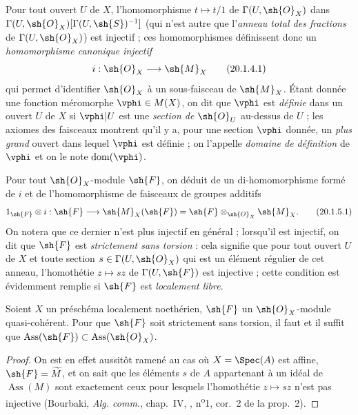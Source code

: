 \begin{env}[20.1.4]
\label{IV.20.1.4}
Pour tout ouvert $U$ de $X$, l'homomorphisme $t\mapsto t/1$ de $\Gamma(U,\sh{O}_X)$ dans $\Gamma(U,\sh{O}_X)[\Gamma(U,\sh{S})^{-1}]$ (qui n'est autre que l'\emph{anneau total des fractions} de
$\Gamma(U,\sh{O}_X)$) est injectif ; ces homomorphismes définissent donc un \emph{homomorphisme canonique injectif}
\[
\label{IV.20.1.4.1}
  i:\sh{O}_X\to\sh{M}_X
  \tag{20.1.4.1}
\]
qui permet d'identifier $\sh{O}_X$ à un sous-faisceau de $\sh{M}_X$.
Étant donnée une fonction méromorphe $\vphi\in M(X)$, on dit que $\vphi$ est \emph{définie} dans un ouvert $U$ de $X$ si $\vphi|U$ est une \emph{section de $\sh{O}_U$} au-dessus de $U$ ; les axiomes des faisceaux montrent qu'il y a, pour une section $\vphi$ donnée, un \emph{plus grand} ouvert dans lequel $\vphi$ est définie ; on l'appelle \emph{domaine de définition} de $\vphi$ et on le note $\operatorname{dom}(\vphi)$.
\end{env}

\begin{env}[20.1.5]
\label{IV.20.1.5}
Pour tout $\sh{O}_X$-module $\sh{F}$, on déduit de  un di-homomorphisme formé de $i$ et de l'homomorphisme de faisceaux de groupes additifs
\[
\label{IV.20.1.5.1}
  1_{\sh{F}}\otimes i:\sh{F}\to\sh{M}_X(\sh{F})=\sh{F}\otimes_{\sh{O}_X}\sh{M}_X.
  \tag{20.1.5.1}
\]
On notera que ce dernier n'est plus injectif en général ; lorsqu'il est injectif, on dit que $\sh{F}$ est \emph{strictement sans torsion} : cela signifie que pour tout ouvert $U$ de $X$ et toute section $s\in\Gamma(U,\sh{O}_X)$ qui est un élément régulier de cet anneau, l'homothétie $z\mapsto sz$ de $\Gamma(U,\sh{F})$ est injective ; cette condition est évidemment remplie si $\sh{F}$ est \emph{localement libre}.
\end{env}

\begin{proposition}[20.1.6]
\label{IV.20.1.6}
Soient $X$ un préschéma localement noethérien, $\sh{F}$ un $\sh{O}_X$-module quasi-cohérent.
Pour que $\sh{F}$ soit strictement sans torsion, il faut et il suffit que $\operatorname{Ass}(\sh{F})\subset\operatorname{Ass}(\sh{O}_X)$.
\end{proposition}

\begin{proof}
On est en effet aussitôt ramené au cas où $X=\Spec(A)$ est affine, $\sh{F}=\widetilde M$, et on sait que les éléments $s$ de $A$ appartenant à un idéal de $\operatorname{Ass}(M)$ sont exactement ceux pour lesquels l'homothétie $z\mapsto sz$ n'est pas injective (Bourbaki, \emph{Alg. comm.}, chap.~IV, , n\textsuperscript{o}1, cor.~2 de la prop.~2).
\end{proof}

